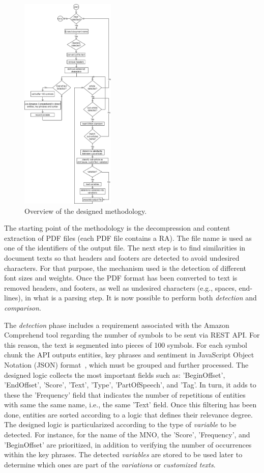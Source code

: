 \begin{figure}[htbp]
\centerline{\includegraphics[width=0.4\textwidth]{images/methodology.png}}
\caption{Overview of the designed methodology.}
\label{fig1}
\end{figure}

The starting point of the methodology is the decompression and content extraction of PDF files (each PDF file contains a RA). The file name is used as one of the identifiers of the output file. The next step is to find similarities in document texts so that headers and footers are detected to avoid undesired characters. For that purpose, the mechanism used is the detection of different font sizes and weights. Once the PDF format has been converted to text is removed headers, and footers, as well as undesired characters (e.g., spaces, end-lines), in what is a parsing step. It is now possible to perform both \textit{detection} and \textit{comparison}.

The \textit{detection} phase includes a requirement associated with the Amazon Comprehend tool regarding the number of symbols to be sent via REST API. For this reason, the text is segmented into pieces of 100 symbols. For each symbol chunk the API outputs entities, key phrases and sentiment in JavaScript Object Notation (JSON) format~\cite{AWS2021}, which must be grouped and further processed. The designed logic collects the most important fields such as: 'BeginOffset', 'EndOffset', 'Score', 'Text', 'Type', 'PartOfSpeech', and 'Tag'. In turn, it adds to these the 'Frequency' field that indicates the number of repetitions of entities with same the same name, i.e., the same 'Text' field. Once this filtering has been done, entities are sorted according to a logic that defines their relevance degree. The designed logic is particularized according to the type of \textit{variable} to be detected. For instance, for the name of the MNO, the 'Score', 'Frequency', and 'BeginOffset' are prioritized, in addition to verifying the number of occurrences within the key phrases. The detected \textit{variables} are stored to be used later to determine which ones are part of the \textit{variations} or \textit{customized texts}.

